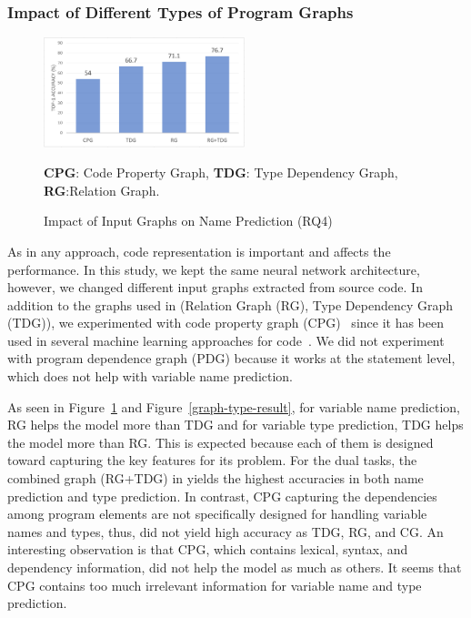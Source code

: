 \subsubsection{Impact of Different Types of Program Graphs}
\label{sec:graphs}

\begin{figure}[t]%
\begin{center}
\includegraphics[width=2.3in]{figures/sensi-graphs-name-2}
\vspace{-8pt}
\caption{Impact of Input Graphs on Name Prediction (RQ4)}
\label{graph-name-result}
{\bf CPG}: Code Property Graph, {\bf TDG}: Type Dependency Graph, {\bf RG}:Relation Graph. 
\end{center}
\end{figure}



As in any approach, code representation is
important and affects the performance. In this study, we
kept the same neural network architecture, however, we changed different
input graphs extracted from source code. In addition to the graphs
used in {\tool} (Relation Graph (RG), Type Dependency Graph (TDG)), we
experimented with code property graph (CPG)~\cite{CPG-2014} since
it has been used in several machine learning approaches for
code~\cite{CPG-2014}. We did not experiment with program dependence
graph (PDG) because it works at the statement level, which does not
help with variable name prediction.

As seen in Figure~\ref{graph-name-result} and
Figure~\ref{graph-type-result}, for variable name prediction, RG helps
the model more than TDG and for variable type prediction, TDG helps
the model more than RG. This is expected because each of them is
designed toward capturing the key features for its problem. For the
dual tasks, the combined graph (RG+TDG) in {\tool} yields the highest
accuracies in both name prediction and type prediction. In contrast,
CPG capturing the dependencies among program elements are not
specifically designed for handling variable names and types, thus, did not
yield high accuracy as TDG, RG, and CG. An interesting observation is
that CPG, which contains lexical, syntax, and dependency information,
did not help the model as much as others. It seems that CPG contains
too much irrelevant information for variable name and type prediction.

